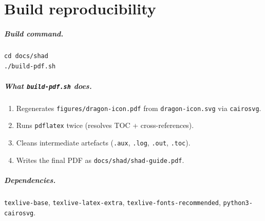 \documentclass[11pt,a4paper,openany]{book}
\begin{document}
\chapter{Build reproducibility}
\label{ch:build}

\paragraph{Build command.}
\begin{lstlisting}[style=shaddata]
cd docs/shad
./build-pdf.sh
\end{lstlisting}

\paragraph{What \texttt{build-pdf.sh} does.}
\begin{enumerate}[leftmargin=*,itemsep=0pt]
\item Regenerates \texttt{figures/dragon-icon.pdf} from \texttt{dragon-icon.svg} via \texttt{cairosvg}.
\item Runs \texttt{pdflatex} twice (resolves TOC + cross-references).
\item Cleans intermediate artefacts (\texttt{.aux}, \texttt{.log}, \texttt{.out}, \texttt{.toc}).
\item Writes the final PDF as \texttt{docs/shad/shad-guide.pdf}.
\end{enumerate}

\paragraph{Dependencies.} \texttt{texlive-base}, \texttt{texlive-latex-extra},
\texttt{texlive-fonts-recommended}, \texttt{python3-cairosvg}.

\end{document}
